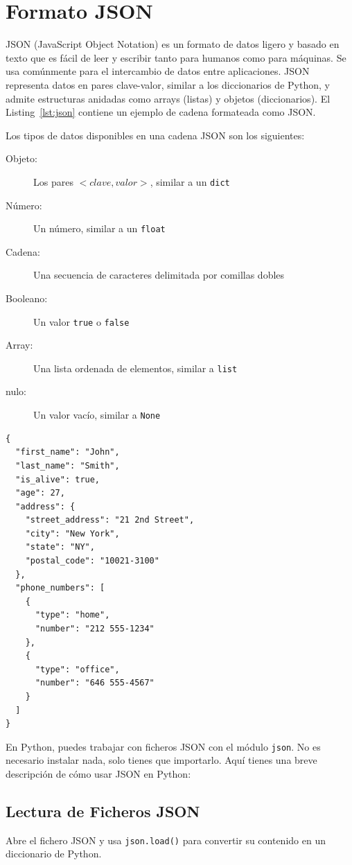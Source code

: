 \documentclass[10pt,a4paper]{article}
\begin{document}
\newpage

\section{Formato JSON}
\label{sec:JSON}

JSON (JavaScript Object Notation) es un formato de datos ligero y basado en texto que es fácil de leer y escribir tanto para humanos como para máquinas. Se usa comúnmente para el intercambio de datos entre aplicaciones. JSON representa datos en pares clave-valor, similar a los diccionarios de Python, y admite estructuras anidadas como arrays (listas) y objetos (diccionarios). El Listing~\ref{lst:json} contiene un ejemplo de cadena formateada como JSON.

Los tipos de datos disponibles en una cadena JSON son los siguientes:

\begin{description}
\item[Objeto:] Los pares $<clave, valor>$, similar a un \lstinline|dict|
\item[Número:] Un número, similar a un \lstinline|float|
\item[Cadena:] Una secuencia de caracteres delimitada por comillas dobles
\item[Booleano:] Un valor \lstinline|true| o \lstinline|false|
\item[Array:] Una lista ordenada de elementos, similar a \lstinline|list|
\item[nulo:] Un valor vacío, similar a \lstinline|None|
\end{description}

\begin{lstlisting}[caption={Ejemplo de cadena formateada como JSON.}, label=lst:json]
{
  "first_name": "John",
  "last_name": "Smith",
  "is_alive": true,
  "age": 27,
  "address": {
    "street_address": "21 2nd Street",
    "city": "New York",
    "state": "NY",
    "postal_code": "10021-3100"
  },
  "phone_numbers": [
    {
      "type": "home",
      "number": "212 555-1234"
    },
    {
      "type": "office",
      "number": "646 555-4567"
    }
  ]
}
\end{lstlisting}

En Python, puedes trabajar con ficheros JSON con el módulo \texttt{json}. No es necesario instalar nada, solo tienes que importarlo. Aquí tienes una breve descripción de cómo usar JSON en Python:

\subsection{Lectura de Ficheros JSON}
Abre el fichero JSON y usa \lstinline|json.load()| para convertir su contenido en un diccionario de Python.
\end{document}
